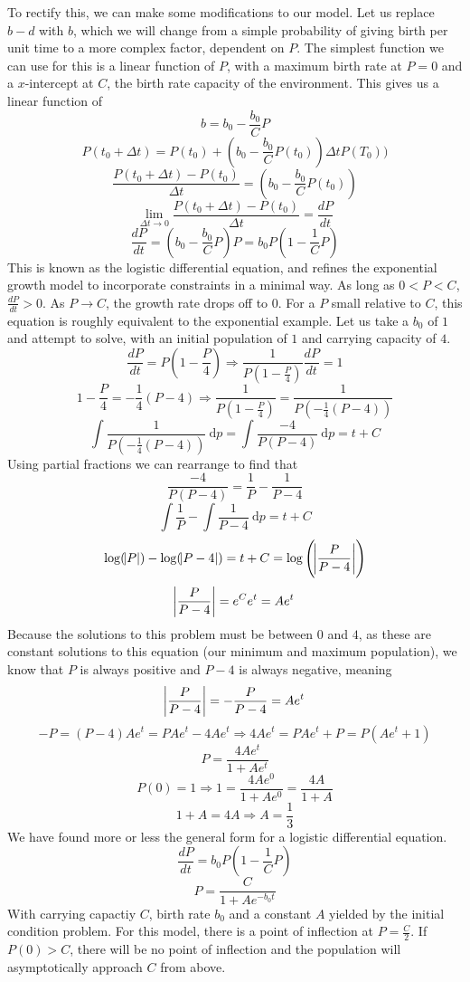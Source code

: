 \documentclass[12pt]{report}
\begin{document}
\begin{flushleft}
\bigskip
To rectify this, we can make some modifications to our model. Let us replace 
\(b - d\) with \(b\), which we will change from a simple probability of giving
birth per unit time to a more complex factor, dependent on \(P\). The simplest
function we can use for this is a linear function of \(P\), with a maximum
birth rate at \(P = 0\) and a \(x\)-intercept at \(C\), the birth rate capacity
of the environment. This gives us a linear function of
\[b = b_0 - \frac{b_0}{C}P\]
\[P(t_0 + \Delta t) = P(t_0) + (b_0 - \frac{b_0}{C}P(t_0))\Delta tP(T_0))\]
\[\frac{P(t_0 + \Delta t) - P(t_0)}{\Delta t} = (b_0 - \frac{b_0}{C}P(t_0))\]
\[\lim_{\Delta t \rightarrow 0} \frac{P(t_0 + \Delta t) - P(t_0)}{\Delta t} 
= \frac{dP}{dt}\]
\[\frac{dP}{dt} = (b_0 - \frac{b_0}{C}P)P = b_0P(1 - \frac{1}{C}P)\]
This is known as the logistic differential equation, and refines the
exponential growth model to incorporate constraints in a minimal way. As long
as \(0 < P < C\), \(\frac{dP}{dt} > 0\). As \(P \rightarrow C\), the growth
rate drops off to \(0\). For a \(P\) small relative to \(C\), this equation is
roughly equivalent to the exponential example. Let us take a \(b_0\) of \(1\)
and attempt to solve, with an initial population of \(1\) and carrying capacity
of \(4\).
\[\frac{dP}{dt} = P(1 - \frac{P}{4}) \Rightarrow \frac{1}{P(1 - \frac{P}{4})}
\frac{dP}{dt} = 1\]
\[1 - \frac{P}{4} = -\frac{1}{4}(P - 4) 
\Rightarrow \frac{1}{P(1 - \frac{P}{4})} = \frac{1}{P(-\frac{1}{4}(P - 4) )}\]
\[\int \frac{1}{P(-\frac{1}{4}(P - 4) )} \:\mathrm{d}p 
= \int \frac{-4}{P(P - 4)} \:\mathrm{d}p = t + C\]
Using partial fractions we can rearrange to find that
\[\frac{-4}{P(P - 4)} = \frac{1}{P} - \frac{1}{P - 4}\]
\[\int \frac{1}{P} - \int \frac{1}{P - 4} \:\mathrm{d}p = t + C\]
\[\log(\abs{P}) - \log(\abs{P - 4}) = t + C 
= \log\left(\abs{\frac{P}{P - 4}}\right)\]
\[\abs{\frac{P}{P - 4}} = e^Ce^t = Ae^t\]
Because the solutions to this problem must be between \(0\) and \(4\), as these
are constant solutions to this equation (our minimum and maximum population),
we know that \(P\) is always positive and \(P - 4\) is always negative, meaning
\[\abs{\frac{P}{P - 4}} = -\frac{P}{P - 4} = Ae^t\]
\[-P = (P - 4)Ae^t = PAe^t - 4Ae^t \Rightarrow 4Ae^t =PAe^t + P = P(Ae^t + 1)\]
\[P = \frac{4Ae^t}{1 + Ae^t}\]
\[P(0) = 1 \Rightarrow 1 = \frac{4Ae^0}{1 + Ae^0} = \frac{4A}{1 + A}\]
\[1 + A = 4A \Rightarrow A = \frac{1}{3}\]
We have found more or less the general form for a logistic differential
equation.
\[\frac{dP}{dt} = b_0P(1 - \frac{1}{C}P)\]
\[P = \frac{C}{1 + Ae^{-b_0t}}\]
With carrying capactiy \(C\), birth rate \(b_0\) and a constant \(A\) yielded
by the initial condition problem. For this model, there is a point of
inflection at \(P = \frac{C}{2}\). If \(P(0) > C\), there will be no point of
inflection and the population will asymptotically approach \(C\) from above.


\end{flushleft}
\end{document}
